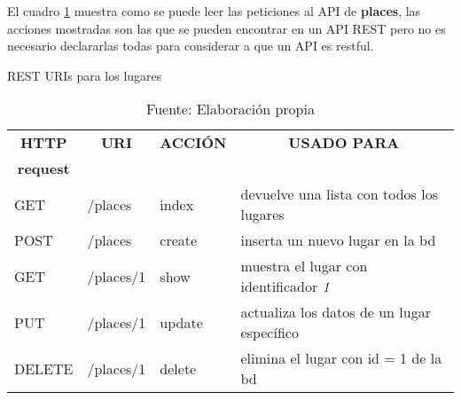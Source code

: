 


  El cuadro \ref{tab:rest} muestra como se puede leer las peticiones al API de \textbf{places}, las acciones mostradas son las que se pueden encontrar en un API REST pero no es necesario declararlas todas para considerar a que un API es restful.\\


  \begin{table}[!hbp]
    \begin{center}
      \caption[recursos REST]{REST URIs para los lugares}
      \label{tab:rest}

      \begin{tabularx}{0.75\textwidth}{ l l l  X }
        \toprule
        \multicolumn{1}{c}{\textbf{HTTP}} &
        \multicolumn{1}{c}{\textbf{URI}}  &
        \multicolumn{1}{c}{\textbf{ACCI\'ON}} &
        \multicolumn{1}{c}{\textbf{USADO PARA}}  \\
        \multicolumn{1}{c}{\textbf{request}} & & & \\

        \midrule
        GET     &  /places    &  index    & devuelve una lista con todos los lugares\\
        POST    &  /places    &  create   & inserta un nuevo lugar en la bd\\
        GET     &  /places/1  &  show     & muestra el lugar con identificador \emph{1}\\
        PUT     &  /places/1  &  update   & actualiza los datos de un lugar específico\\
        DELETE  &  /places/1  &  delete   & elimina el lugar con id = 1 de la bd\\
        \bottomrule
      \end{tabularx}

      \caption*{Fuente: Elaboración propia}
    \end{center}
  \end{table}

